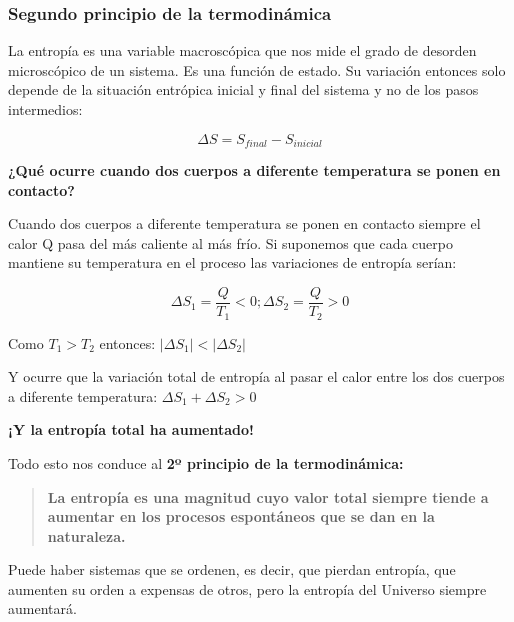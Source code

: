 \documentclass[
  spanish,
]{article}
\begin{document}
\hypertarget{segundo-principio-de-la-termodinuxe1mica}{%
\subsubsection{Segundo principio de la
termodinámica}\label{segundo-principio-de-la-termodinuxe1mica}}

La entropía es una variable macroscópica que nos mide el grado de
desorden microscópico de un sistema. Es una función de estado. Su
variación entonces solo depende de la situación entrópica inicial y
final del sistema y no de los pasos intermedios:

\[\Delta S = S_{final} - S_{inicial}\]

\hfill{}\textbf{¿Qué
ocurre cuando dos cuerpos a diferente temperatura se ponen en contacto?}

Cuando dos cuerpos a diferente temperatura se ponen en contacto siempre
el calor Q pasa del más caliente al más frío. Si suponemos que cada
cuerpo mantiene su temperatura en el proceso las variaciones de entropía
serían:

\[\Delta S_{1} = \frac{Q}{T_{1}} < 0;\Delta S_{2} = \frac{Q}{T_{2}} > 0\]

Como \(T_1 > T_2\) entonces:
\(\left| \Delta S_{1} \right| < \left| \Delta S_{2} \right|\)

Y ocurre que la variación total de entropía al pasar el calor entre los
dos cuerpos a diferente temperatura: \(\Delta S_{1} + \Delta S_{2} > 0\)

\textbf{¡Y la entropía total ha aumentado!}

Todo esto nos conduce al \textbf{2º principio de la termodinámica:}

\begin{quote}
\textbf{La entropía es una magnitud cuyo valor total siempre tiende a
aumentar en los procesos espontáneos que se dan en la naturaleza.}
\end{quote}

Puede haber sistemas que se ordenen, es decir, que pierdan entropía, que
aumenten su orden a expensas de otros, pero la entropía del Universo
siempre aumentará.
\end{document}

